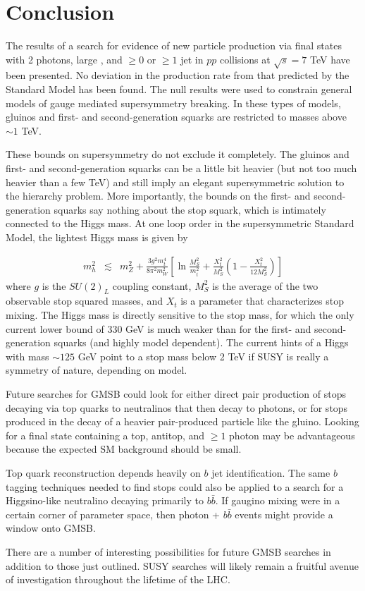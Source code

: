 \documentclass[dissertation.tex]{subfiles}
\begin{document}
\chapter{Conclusion}
\label{chap:Conclusion}

The results of a search for evidence of new particle production via final states with 2 photons, large \MET, and $\geq0$ or $\geq1$ jet in $pp$ collisions at $\sqrt{s} = 7$ TeV have been presented.  No deviation in the production rate from that predicted by the Standard Model has been found.  The null results were used to constrain general models of gauge mediated supersymmetry breaking.  In these types of models, gluinos and first- and second-generation squarks are restricted to masses above $\sim1$ TeV.

These bounds on supersymmetry do not exclude it completely.  The gluinos and first- and second-generation squarks can be a little bit heavier (but not too much heavier than a few TeV) and still imply an elegant supersymmetric solution to the hierarchy problem.  More importantly, the bounds on the first- and second-generation squarks say nothing about the stop squark, which is intimately connected to the Higgs mass.  At one loop order in the supersymmetric Standard Model, the lightest Higgs mass is given by \cite{Carena}

\begin{eqnarray}
m_{h}^{2} &\lesssim& m_{Z}^{2} + \frac{3g^{2}m_{t}^{4}}{8\pi^{2}m_{W}^{2}}\left[\ln\frac{M_{S}^{2}}{m_{t}^{2}} + \frac{X_{t}^{2}}{M_{S}^{2}}(1 - \frac{X_{t}^{2}}{12M_{S}^{2}})\right]
\end{eqnarray}
%
where $g$ is the $SU(2)_{L}$ coupling constant, $M_{S}^{2}$ is the average of the two observable stop squared masses, and $X_{t}$ is a parameter that characterizes stop mixing.  The Higgs mass is directly sensitive to the stop mass, for which the only current lower bound of 330 GeV \cite{ATLAS_GMSB_stop_search} is much weaker than for the first- and second-generation squarks (and highly model dependent).  The current hints of a Higgs with mass $\sim125$ GeV \cite{CMS_Higgs, ATLAS_Higgs} point to a stop mass below 2 TeV if SUSY is really a symmetry of nature, depending on model.

Future searches for GMSB could look for either direct pair production of stops decaying via top quarks to neutralinos that then decay to photons, or for stops produced in the decay of a heavier pair-produced particle like the gluino.  Looking for a final state containing a top, antitop, and $\geq1$ photon may be advantageous because the expected SM background should be small.

Top quark reconstruction depends heavily on $b$ jet identification.  The same $b$ tagging techniques needed to find stops could also be applied to a search for a Higgsino-like neutralino decaying primarily to $b\bar{b}$.  If gaugino mixing were in a certain corner of parameter space, then photon + $b\bar{b}$ events might provide a window onto GMSB.

There are a number of interesting possibilities for future GMSB searches in addition to those just outlined.  SUSY searches will likely remain a fruitful avenue of investigation throughout the lifetime of the LHC.
\end{document}
